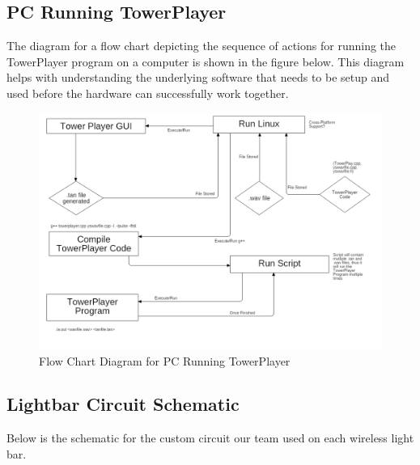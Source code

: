\documentclass[12pt]{article}
\begin{document}
{{{{{	\subsection{PC Running TowerPlayer}
	The diagram for a flow chart depicting the sequence of actions for running the TowerPlayer program on a computer is shown in the figure below. This diagram helps with understanding the underlying software that needs to be setup and used before the hardware can successfully work together.
	
		\begin{figure}[ht!]
			\centering
			\includegraphics[width=170mm]{assets/PCRunningTowerPlayerFlowChartDiagram.png}
			\caption{Flow Chart Diagram for PC Running TowerPlayer \label{overflow}}
		\end{figure}

	\clearpage
	
	\subsection{Lightbar Circuit Schematic}
	Below is the schematic for the custom circuit our team used on each wireless light bar.\\
	
}}}}}
\end{document}

